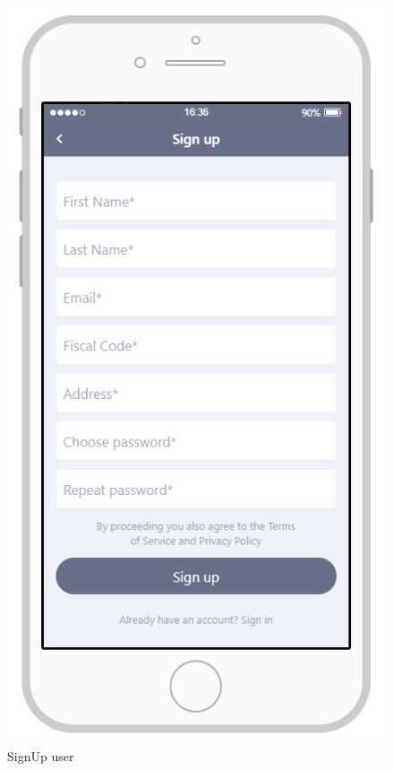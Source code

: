 \documentclass{article}
\begin{document}
\begin{figure}[H]
    \centering
    \includegraphics[scale=0.7]{Images/SignUpUtenteAPP}
    \caption{SignUp user}
\end{figure}
\end{document}
